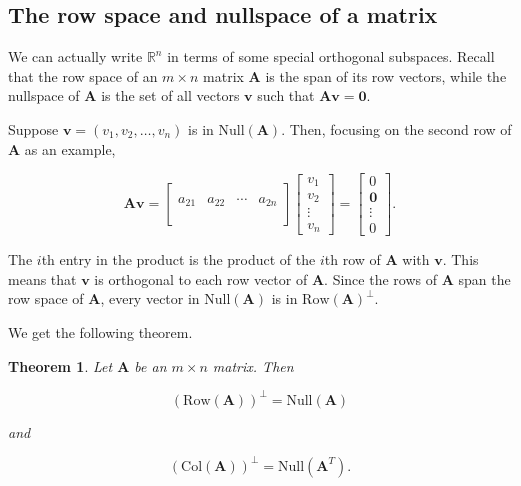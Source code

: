 \documentclass[
]{book}
\newtheorem{theorem}{Theorem}[chapter]
\theoremstyle{definition}
\theoremstyle{definition}
\theoremstyle{definition}
\theoremstyle{definition}
\theoremstyle{remark}
\begin{document}
\subsection*{The row space and nullspace of a matrix}\label{the-row-space-and-nullspace-of-a-matrix}

We can actually write \(\mathbb{R}^n\) in terms of some special orthogonal subspaces. Recall that the row space of an \(m\times n\) matrix \(\mathbf{A}\) is the span of its row vectors, while the nullspace of \(\mathbf{A}\) is the set of all vectors \(\mathbf{v}\) such that \(\mathbf{A}\mathbf{v}=\mathbf{0}\).

Suppose \(\mathbf{v}=(v_1,v_2,\dots,v_n)\) is in \(\text{Null}(\mathbf{A})\). Then, focusing on the second row of \(\mathbf{A}\) as an example,

\[\mathbf{A}\mathbf{v}=\begin{bmatrix} &  &  & \\a_{21} & a_{22} & \cdots & a_{2n}\\
&&&\\ &  &  & \end{bmatrix}\begin{bmatrix}v_1\\v_2\\\vdots \\v_n\end{bmatrix}=\begin{bmatrix}0\\\mathbf{0}\\ \vdots \\ 0\end{bmatrix}.\]

The \(i\)th entry in the product is the product of the \(i\)th row of \(\mathbf{A}\) with \(\mathbf{v}\). This means that \(\mathbf{v}\) is orthogonal to each row vector of \(\mathbf{A}\). Since the rows of \(\mathbf{A}\) span the row space of \(\mathbf{A}\), every vector in \(\text{Null}(\mathbf{A})\) is in \(\text{Row}(\mathbf{A})^{\perp}\).

We get the following theorem.

\begin{theorembox}

\begin{theorem}
\protect\hypertarget{thm:MatSubspaces}{}\label{thm:MatSubspaces}Let \(\mathbf{A}\) be an \(m\times n\) matrix. Then

\[(\textrm{Row}(\mathbf{A}))^\perp=\textrm{Null}(\mathbf{A})\]

and

\[(\textrm{Col}(\mathbf{A}))^{\perp}=\textrm{Null}(\mathbf{A}^T).\]
\end{theorem}

\end{theorembox}
\end{document}
